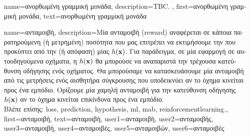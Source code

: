 {name={\foreignlanguage{greek}{ανορθωμένη γραμμική μονάδα}},
	description={TBC. }, 
	first={\foreignlanguage{greek}{ανορθωμένη γραμμική μονάδα}}, 
	text={\foreignlanguage{greek}{ανορθωμένη γραμμική μονάδα}} 
}%

{name={\foreignlanguage{greek}{ανταμοιβή}}, 
	description={\foreignlanguage{greek}{Μία ανταμοιβή} (reward) \foreignlanguage{greek}{αναφέρεται σε κάποια 
		παρατηρούμενη} \foreignlanguage{greek}{(ή μετρημένη) ποσότητα που μας επιτρέπει να 
		εκτιμήσουμε την}  \foreignlanguage{greek}{που προκύπτει από την}  
		\foreignlanguage{greek}{(ή απόφαση) μίας}  $h({\bf x})$. \foreignlanguage{greek}{Για παράδειγμα, 
		σε μία εφαρμογή}  \foreignlanguage{greek}{σε αυτοοδηγούμενα οχήματα, η $h({\bf x})$ θα μπορούσε 
		να αναπαριστά την τρέχουσα κατεύθυνση οδήγησης ενός οχήματος. Θα μπορούσαμε να κατασκευάσουμε μία ανταμοιβή από τις 
		μετρήσεις ενός αισθητήρα σύγκρουσης που υποδεικνύει αν το όχημα κινείται προς ένα εμπόδιο. Ορίζουμε μία χαμηλή ανταμοιβή 
		για την κατεύ\-θυνση οδήγησης $h({\bf x})$ αν το όχημα κινείται επικίνδυνα προς ένα εμπόδιο.} 
		\\
		\foreignlanguage{greek}{Βλέπε επίσης:} \gls{loss}, \gls{prediction}, \gls{hypothesis}, \gls{ml}, \gls{mab}, \gls{reinforcementlearning}.},
	first={\foreignlanguage{greek}{ανταμοιβή}}, 
	text={\foreignlanguage{greek}{ανταμοιβή}},
	user1={\foreignlanguage{greek}{ανταμοιβή}}, %
	user2={\foreignlanguage{greek}{ανταμοιβής}}, %
	user3={\foreignlanguage{greek}{ανταμοιβή}}, %
	user4={\foreignlanguage{greek}{ανταμοιβές}}, %
	user5={\foreignlanguage{greek}{ανταμοιβών}}, %
	user6={\foreignlanguage{greek}{ανταμοιβές}} %
} 

